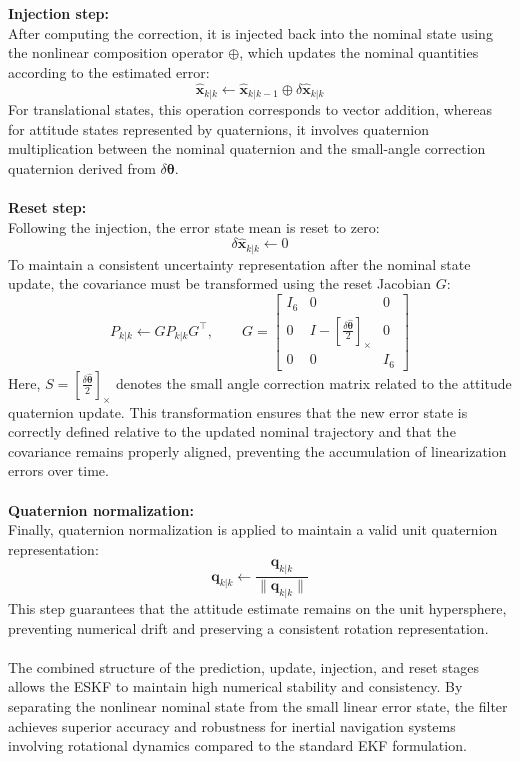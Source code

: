 \textbf{Injection step:} \\ \noindent
After computing the correction, it is injected back into the nominal state using the nonlinear composition operator $\oplus$, which updates the nominal quantities according to the estimated error:
$$
    \hat{\mathbf{x}}_{k|k} \leftarrow \hat{\mathbf{x}}_{k|k-1} \oplus \delta\hat{\mathbf{x}}_{k|k}
$$
For translational states, this operation corresponds to vector addition, whereas for attitude states represented by quaternions, it involves quaternion multiplication between the nominal quaternion and the small-angle correction quaternion derived from $\delta\boldsymbol{\theta}$.
\\ \\
\textbf{Reset step:} \\ \noindent
Following the injection, the error state mean is reset to zero:
$$
    \delta\hat{\mathbf{x}}_{k|k} \leftarrow 0
$$
To maintain a consistent uncertainty representation after the nominal state update, the covariance must be transformed using the reset Jacobian $G$:
$$
    P_{k|k} \leftarrow G P_{k|k} G^\top, \qquad 
    G =
    \begin{bmatrix}
        I_6 & 0 & 0 \\
        0 & I - [\tfrac{\delta\hat{\boldsymbol{\theta}}}{2}]_\times & 0 \\
        0 & 0 & I_6
    \end{bmatrix}
$$
Here, $S = [\tfrac{\delta\hat{\boldsymbol{\theta}}}{2}]_\times$ denotes the small angle correction matrix related to the attitude quaternion update. This transformation ensures that the new error state is correctly defined relative to the updated nominal trajectory and that the covariance remains properly aligned, preventing the accumulation of linearization errors over time.
\\ \\
\textbf{Quaternion normalization:} \\ \noindent
Finally, quaternion normalization is applied to maintain a valid unit quaternion representation:
$$
    \mathbf{q}_{k|k} \leftarrow \frac{\mathbf{q}_{k|k}}{\|\mathbf{q}_{k|k}\|}
$$
This step guarantees that the attitude estimate remains on the unit hypersphere, preventing numerical drift and preserving a consistent rotation representation.
\\ \\
The combined structure of the prediction, update, injection, and reset stages allows the ESKF to maintain high numerical stability and consistency. By separating the nonlinear nominal state from the small linear error state, the filter achieves superior accuracy and robustness for inertial navigation systems involving rotational dynamics compared to the standard EKF formulation.



